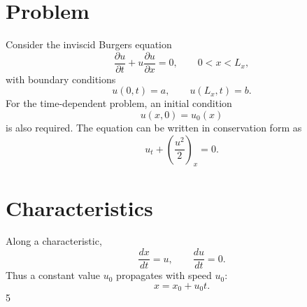 \documentclass{mooiman_memo}
\begin{document}
\maketitle

\section{Problem}

Consider the inviscid Burgers equation
%
\begin{equation}
    \frac{\partial u}{\partial t}
    +u\frac{\partial u}{\partial x}=0,
    \qquad 0<x<L_x,
\end{equation}
%
with boundary conditions
%
\begin{equation}
    u(0,t)=a,
    \qquad
    u(L_x,t)=b.
\end{equation}
%
For the time-dependent problem, an initial condition
\begin{equation}
    u(x,0)=u_0(x)
\end{equation}
is also required.
%
The equation can be written in conservation form as
%
\begin{equation}
    u_t+\left(\frac{u^2}{2}\right)_x=0.
\end{equation}
%
\section{Characteristics}
%
Along a characteristic,
%
\begin{equation}
    \frac{dx}{dt}=u,
    \qquad
    \frac{du}{dt}=0.
\end{equation}
%
Thus a constant value $u_0$ propagates with speed $u_0$:
%
\begin{equation}
    x=x_0+u_0t.
\end{equation}
5
\end{document}
